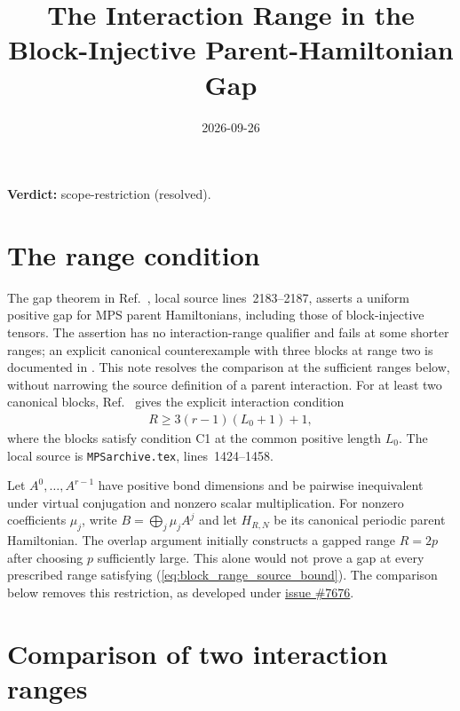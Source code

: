 \documentclass{article}
\title{The Interaction Range in the Block-Injective Parent-Hamiltonian Gap}
\author{}
\date{2026-09-26}
\providecommand{\gapnote}[2]{%
    \par\noindent\textbf{Verdict:} #1 (#2).\par}
\begin{document}
\maketitle
\gapnote{scope-restriction}{resolved}

\section{The range condition}

The gap theorem in Ref.~\cite[Section~IV.C, Gaps]{Cirac2021Matrix},
local source lines~2183--2187, asserts a uniform positive gap for MPS
parent Hamiltonians, including those of block-injective tensors. The
assertion has no interaction-range qualifier and fails at some shorter
ranges; an explicit canonical counterexample with three blocks at range two
is documented in
. This note resolves
the comparison at the sufficient ranges below, without narrowing the
source definition of a parent interaction.
For at least two canonical blocks, Ref.~\cite[Theorem~12]{PerezGarcia2007MPSReps}
gives the explicit interaction condition
\begin{align}
    R\geq 3(r-1)(L_0+1)+1,
    \label{eq:block_range_source_bound}
\end{align}
where the blocks satisfy condition C1 at the common positive length $L_0$.
The local source is \texttt{MPSarchive.tex}, lines~1424--1458.

Let $A^0,\ldots,A^{r-1}$ have positive bond dimensions and be pairwise
inequivalent under virtual conjugation and nonzero scalar multiplication.
For nonzero coefficients $\mu_j$, write $B=\bigoplus_j\mu_j A^j$ and let
$H_{R,N}$ be its canonical periodic parent Hamiltonian.
The overlap argument initially constructs a gapped range $R=2p$ after
choosing $p$ sufficiently large. This alone would not prove a gap at every
prescribed range satisfying (\ref{eq:block_range_source_bound}).
The comparison below removes this restriction, as developed under
\href{https://github.com/LionSR/TNLean/issues/7676}{issue \#7676}.

\section{Comparison of two interaction ranges}
\end{document}

